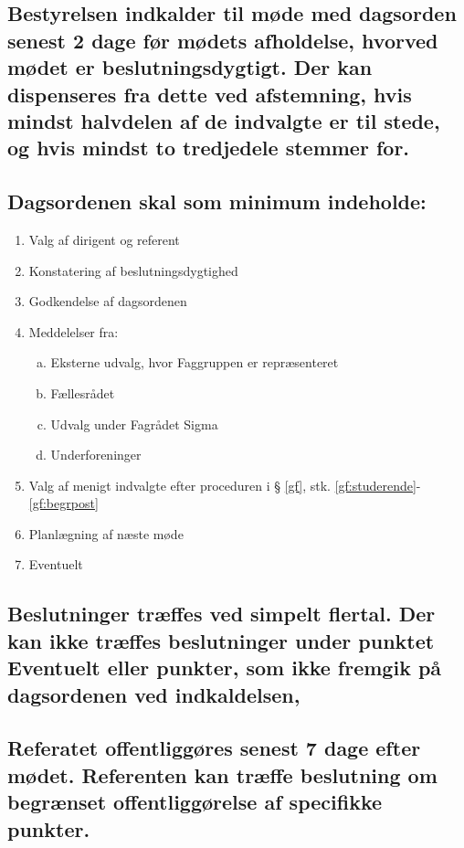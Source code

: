 \documentclass[10pt]{article}
\begin{document}
	\subsection{Bestyrelsen indkalder til møde med dagsorden senest 2 dage før mødets afholdelse, hvorved mødet er beslutningsdygtigt. Der kan dispenseres fra dette ved afstemning, hvis mindst halvdelen af de indvalgte er til stede, og hvis mindst to tredjedele stemmer for.}\label{FRM:indkaldelse}
	
	\subsection{Dagsordenen skal som minimum indeholde:}\label{FRM:dagsorden}
	
	\begin{enumerate}[1), nosep]
		\item Valg af dirigent og referent
		\item Konstatering af beslutningsdygtighed
		\item Godkendelse af dagsordenen
		\item Meddelelser fra:
		\begin{enumerate}[a., nosep]
			\item Eksterne udvalg, hvor Faggruppen er repræsenteret
			\item Fællesrådet
			\item Udvalg under Fagrådet Sigma
			\item Underforeninger
		\end{enumerate}
		\item Valg af menigt indvalgte efter proceduren i § \ref{gf}, stk. \ref{gf:studerende}-\ref{gf:begrpost}
		\item Planlægning af næste møde
		\item Eventuelt
	\end{enumerate}
	
	\subsection{Beslutninger træffes ved simpelt flertal. Der kan ikke træffes beslutninger under punktet Eventuelt eller punkter, som ikke fremgik på dagsordenen ved indkaldelsen,}\label{FRM:beslutninger}
	
	\subsection{Referatet offentliggøres senest 7 dage efter mødet. Referenten kan træffe beslutning om begrænset offentliggørelse af specifikke punkter.}
	
\end{document}
